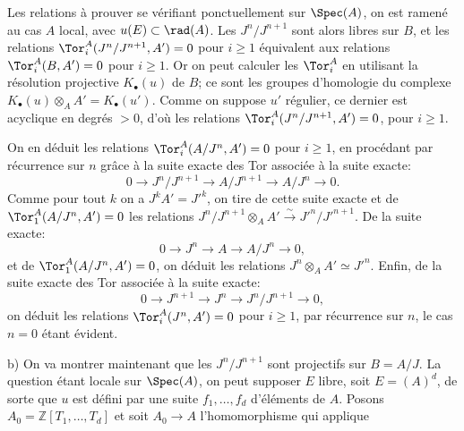 
Les relations à prouver se vérifiant ponctuellement sur $\Spec(A)$, on est ramené au cas $A$ local, avec $u(E)\subset\rad(A)$. Les $J^n/J^{n+1}$ sont alors libres sur $B$, et les relations $\Tor_i^A(J^n/J^{n+1},A')=0$ pour $i\geq1$ équivalent aux relations $\Tor_i^A(B,A')=0$ pour $i\geq1$. Or on peut calculer les $\Tor_i^A$ en utilisant la résolution projective $K_\bullet(u)$ de $B$; ce sont les groupes d'homologie du complexe $K_\bullet(u)\otimes_AA'=K_\bullet(u')$. Comme on suppose $u'$ régulier, ce dernier est acyclique en degrés $>0$, d'où les relations $\Tor_i^A(J^n/J^{n+1},A')=0$, pour $i\geq1$.

On en déduit les relations $\Tor_i^A(A/J^n,A')=0$ pour $i\geq1$, en procédant par récurrence sur $n$ grâce à la suite exacte des Tor associée à la suite exacte:
\[
 0\longrightarrow J^n/J^{n+1}\longrightarrow A/J^{n+1}\longrightarrow A/J^n\longrightarrow0.
\]
Comme pour tout $k$ on a $J^kA'=J'^k$, on tire de cette suite exacte et de $\Tor_1^A(A/J^n,A')=0$ les relations $J^n/J^{n+1}\otimes_AA'\xrightarrow{\sim}J'^n/J'^{n+1}$. De la suite exacte:
\[
 0\longrightarrow J^n\longrightarrow A\longrightarrow A/J^n\longrightarrow0,
\]
et de $\Tor_1^A(A/J^n,A')=0$, on déduit les relations $J^n\otimes_AA'\simeq J'^n$. Enfin, de la suite exacte des Tor associée à la suite exacte:
\[
 0\longrightarrow J^{n+1}\longrightarrow J^n\longrightarrow J^n/J^{n+1}\longrightarrow0,
\]
on déduit les relations $\Tor_i^A(J^n,A')=0$ pour $i\geq1$, par récurrence sur $n$, le cas $n=0$ étant évident.

b) On va montrer maintenant que les $J^n/J^{n+1}$ sont projectifs sur $B=A/J$. La question étant locale sur $\Spec(A)$, on peut supposer $E$ libre, soit $E=(A)^d$, de sorte que $u$ est défini par une suite $f_1,\ldots,f_d$ d'éléments de $A$. Posons $A_0=\mathbb Z[T_1,\ldots,T_d]$ et soit $A_0\longrightarrow A$ l'homomorphisme qui applique
